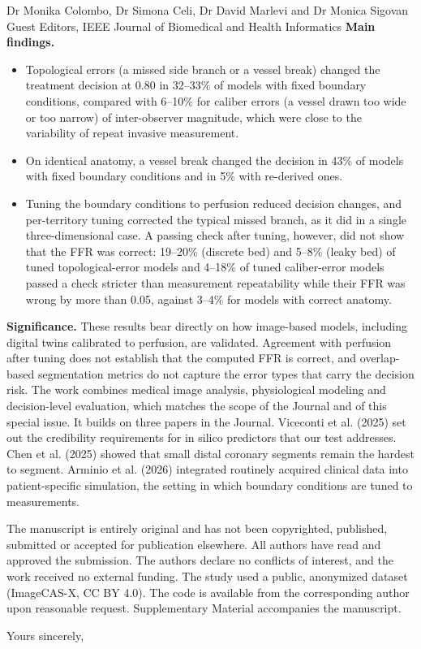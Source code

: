 \documentclass[10pt]{letter}
\begin{document}
\begin{letter}{Dr Monika Colombo, Dr Simona Celi, Dr David Marlevi and Dr Monica Sigovan\\Guest Editors, IEEE Journal of Biomedical and Health Informatics}
\textbf{Main findings.}
\begin{itemize}
\item Topological errors (a missed side branch or a vessel break) changed the treatment decision at 0.80 in 32--33\%
of models with fixed boundary conditions, compared with 6--10\% for caliber errors (a vessel drawn too wide or too narrow) of inter-observer magnitude, which
were close to the variability of repeat invasive measurement.
\item On identical anatomy, a vessel break changed the decision in 43\% of models with fixed boundary conditions and
in 5\% with re-derived ones.
\item Tuning the boundary conditions to perfusion reduced decision changes, and per-territory tuning corrected the
typical missed branch, as it did in a single three-dimensional case. A passing check after tuning, however, did not
show that the FFR was correct: 19--20\% (discrete bed) and 5--8\% (leaky bed) of tuned topological-error models and 4--18\% of tuned caliber-error models passed
a check stricter than measurement repeatability while their FFR was wrong by more than 0.05, against 3--4\% for
models with correct anatomy.
\end{itemize}

\textbf{Significance.} These results bear directly on how image-based models, including digital twins calibrated to
perfusion, are validated. Agreement with
perfusion after tuning does not establish that the computed FFR is correct, and overlap-based segmentation metrics do not capture the error types that
carry the decision risk. The work combines medical image analysis, physiological modeling and decision-level
evaluation, which matches the scope of the Journal and of this special issue. It builds on three papers in the
Journal. Viceconti et al. (2025) set out the credibility requirements for in silico predictors that our test
addresses. Chen et al. (2025) showed that small distal coronary segments remain the hardest to segment. Arminio et al.
(2026) integrated routinely acquired clinical data into patient-specific simulation, the setting in which boundary
conditions are tuned to measurements.

The manuscript is entirely original and has not been copyrighted, published, submitted or accepted for publication
elsewhere. All authors have read
and approved the submission. The authors declare no conflicts of interest, and the work received no external funding.
The study used a public, anonymized dataset (ImageCAS-X, CC BY 4.0). The code is available from the corresponding author upon reasonable request. Supplementary Material accompanies the manuscript.

\closing{Yours sincerely,}
\end{letter}
\end{document}
